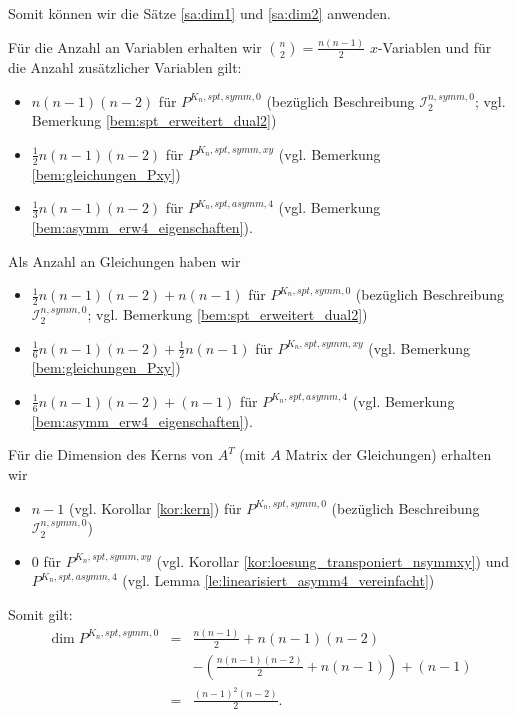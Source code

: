 \documentclass[10p,a4paper,BCOR = 12mm, DIV=15]{scrbook}
\begin{document}
{\begin{bew}
Somit können wir die Sätze \ref{sa:dim1} und \ref{sa:dim2} anwenden.

Für die Anzahl an Variablen erhalten wir ${n \choose 2} = \frac{n \left(n-1\right)}{2}$ $x$-Variablen und für die Anzahl zusätzlicher Variablen gilt:
\begin{itemize}
\item $n \left(n-1\right) \left(n-2\right)$ für $P^{K_n, spt, symm, 0}$ (bezüglich Beschreibung $\mathcal{I}^{n, symm, 0}_2$; vgl. Bemerkung \ref{bem:spt_erweitert_dual2})
\item $\frac{1}{2} n \left(n-1\right) \left(n-2\right)$ für $P^{K_n, spt, symm, xy}$ (vgl. Bemerkung \ref{bem:gleichungen_Pxy})
\item $\frac{1}{3} n \left(n-1\right) \left(n-2\right)$ für $P^{K_n, spt, asymm, 4}$ (vgl. Bemerkung \ref{bem:asymm_erw4_eigenschaften}).
\end{itemize}

Als Anzahl an Gleichungen haben wir
\begin{itemize}
\item $\frac{1}{2} n \left(n-1\right) \left(n-2\right) + n \left(n-1\right)$ für $P^{K_n, spt, symm, 0}$ (bezüglich Beschreibung $\mathcal{I}^{n, symm, 0}_2$; vgl. Bemerkung \ref{bem:spt_erweitert_dual2})
\item $\frac{1}{6} n \left(n-1\right) \left(n-2\right) + \frac{1}{2} n \left(n-1\right)$ für $P^{K_n, spt, symm, xy}$ (vgl. Bemerkung \ref{bem:gleichungen_Pxy})
\item $\frac{1}{6} n \left(n-1\right) \left(n-2\right) + \left(n-1\right)$ für $P^{K_n, spt, asymm, 4}$ (vgl. Bemerkung \ref{bem:asymm_erw4_eigenschaften}).
\end{itemize}

Für die Dimension des Kerns von $A^T$ (mit $A$ Matrix der Gleichungen) erhalten wir
\begin{itemize}
\item $n-1$ (vgl. Korollar \ref{kor:kern}) für $P^{K_n, spt, symm, 0}$ (bezüglich Beschreibung $\mathcal{I}^{n, symm, 0}_2$)
\item $0$ für $P^{K_n, spt, symm, xy}$ (vgl. Korollar \ref{kor:loesung_transponiert_nsymmxy}) und $P^{K_n, spt, asymm, 4}$ (vgl. Lemma \ref{le:linearisiert_asymm4_vereinfacht})
\end{itemize}

Somit gilt: 
\begin{eqnarray*}
\dim P^{K_n, spt, symm, 0} & = & \frac{n \left(n-1\right)}{2}+n \left(n-1\right)(n-2) \\
& & -\left(\frac{n \left(n-1\right)\left(n-2\right)}{2}+n \left(n-1\right)\right)+\left(n-1\right) \\
& = & \frac{\left(n-1\right)^2 \left(n-2\right)}{2}.
\end{eqnarray*}


\end{bew}}
\end{document}
